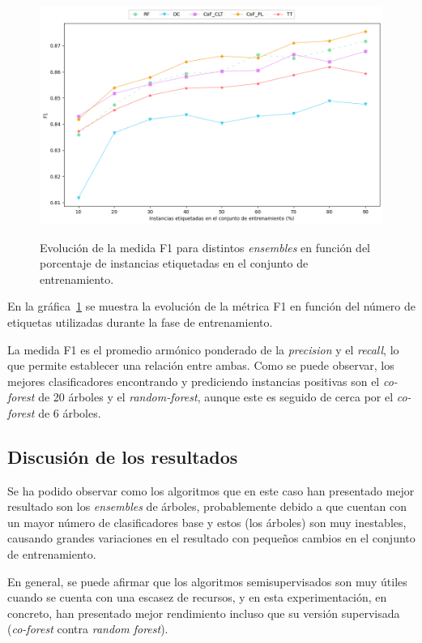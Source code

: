 \begin{figure}[h]
	\caption[\textit{Phishing}: comparativa SL contra SSL (F1~\textit{score})]{Evolución de la medida F1 para distintos \textit{ensembles} en función del porcentaje de instancias etiquetadas en el conjunto de entrenamiento.}
	\centering
	\includegraphics[scale=0.45]{../img/memoria/5_phishing/f1f19_evolution_f1}
	\label{gr:ph-f1f19_sl-ssl-f1}
\end{figure}

En la gráfica~\ref{gr:ph-f1f19_sl-ssl-f1} se muestra la evolución de la métrica F1 en función del número de etiquetas utilizadas durante la fase de entrenamiento. 

La medida F1 es el promedio armónico ponderado de la \textit{precision} y el \textit{recall}, lo que permite establecer una relación entre ambas. Como se puede observar, los mejores clasificadores encontrando y prediciendo instancias positivas son el \textit{co-forest} de 20 árboles y el \textit{random-forest}, aunque este es seguido de cerca por el \textit{co-forest} de 6 árboles.

\subsection{Discusión de los resultados}

Se ha podido observar como los algoritmos que en este caso han presentado mejor resultado son los \textit{ensembles} de árboles, probablemente debido a que cuentan con un mayor número de clasificadores base y estos (los árboles) son muy inestables, causando grandes variaciones en el resultado con pequeños cambios en el conjunto de entrenamiento.

En general, se puede afirmar que los algoritmos semisupervisados son muy útiles cuando se cuenta con una escasez de recursos, y en esta experimentación, en concreto, han presentado mejor rendimiento incluso que su versión supervisada (\textit{co-forest} contra \textit{random forest}).


